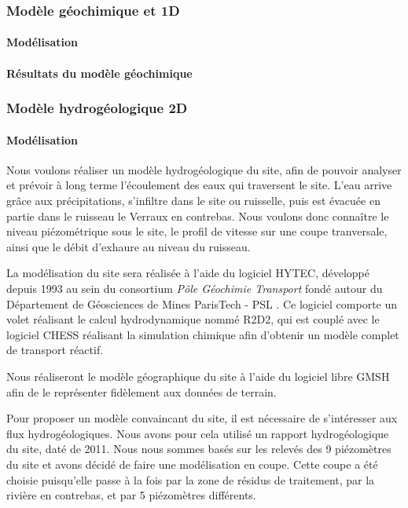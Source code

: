 \documentclass{article}
\begin{document}
\subsubsection{Modèle géochimique et 1D}
\paragraph{Modélisation}


\paragraph{Résultats du modèle géochimique }

\subsubsection{Modèle hydrogéologique 2D}
\paragraph{Modélisation}
Nous voulons réaliser un modèle hydrogéologique du site, afin de pouvoir analyser et prévoir à long terme l'écoulement des eaux qui traversent le site. L'eau arrive grâce aux précipitations, s'infiltre dans le site ou ruisselle, puis est évacuée en partie dans le ruisseau le Verraux en contrebas. Nous voulons donc connaître le niveau piézométrique sous le site, le profil de vitesse sur une coupe tranversale, ainsi que le débit d'exhaure au niveau du ruisseau.

La modélisation du site sera réalisée à l'aide du logiciel HYTEC, développé depuis 1993 au sein du consortium \emph{Pôle Géochimie Transport} fondé autour du Département de Géosciences de Mines ParisTech - PSL \cite{site_hytec_hydrodynamique_nodate}. 
Ce logiciel comporte un volet réalisant le calcul hydrodynamique nommé R2D2, qui est couplé avec le logiciel CHESS réalisant la simulation chimique \cite{lagneau:hal-00614306} afin d'obtenir un modèle complet de transport réactif.

Nous réaliseront le modèle géographique du site à l'aide du logiciel libre GMSH \cite{gmsh_site} afin de le représenter fidèlement aux données de terrain.

Pour proposer un modèle convaincant du site, il est nécessaire de s’intéresser aux flux hydrogéologiques. Nous avons pour cela utilisé un rapport hydrogéologique du site, daté de 2011. Nous nous sommes basés sur les relevés des 9 piézomètres du site et avons décidé de faire une modélisation en coupe. Cette coupe a été choisie puisqu’elle passe à la fois par la zone de résidus de traitement, par la rivière en contrebas, et par 5 piézomètres différents.
\end{document}
